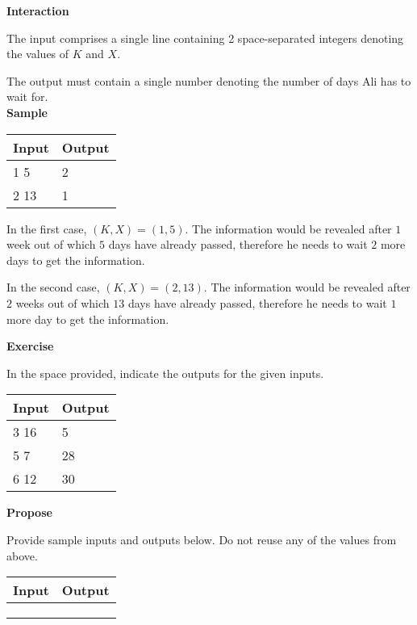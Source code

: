 \documentclass[a4paper]{exam}
\newcommand\heading[1]{\textbf{#1}}
\begin{document}
\begin{questions}
    \heading{Interaction}

    The input comprises a single line containing 2 space-separated integers denoting the values of $K$ and $X$.

    The output must contain a single number denoting the number of days Ali has to wait for.\\
    \heading{Sample}

    \begin{tabularx}{\textwidth}{|X|X|}
        \rowcolor{gray!50}
        \hline
        Input & Output \\ \hline\hline
        1 5   & 2      \\\hline
        2 13  & 1      \\\hline
    \end{tabularx}

    In the first case, $(K,X)=(1,5)$. The information would be revealed after $1$ week out of which $5$ days have already passed, therefore he needs to wait $2$ more days to get the information.

    In the second case, $(K,X)=(2,13)$. The information would be revealed after $2$ weeks out of which $13$ days have already passed, therefore he needs to wait $1$ more day to get the information.

    \heading{Exercise}

    In the space provided, indicate the outputs for the given inputs.

    \begin{tabularx}{\textwidth}{|X|X|}
        \rowcolor{gray!50}
        \hline
        Input & Output \\ \hline\hline
        3 16  & 5      \\\hline
        5 7   & 28     \\\hline
        6 12  & 30     \\\hline
    \end{tabularx}

    \heading{Propose}

    Provide sample inputs and outputs below. Do not reuse any of the values from above.

    \begin{tabularx}{\textwidth}{|X|X|}
        \rowcolor{gray!50}
        \hline
        Input & Output \\ \hline\hline
              &        \\\hline
              &        \\\hline
              &        \\\hline
    \end{tabularx}


\end{questions}
\end{document}
